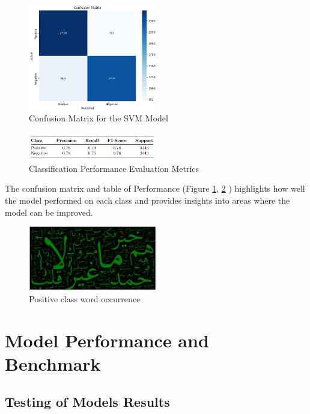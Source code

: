 \documentclass[a4paper,40pt,twocolumn]{article}
\begin{document}
\begin{figure}[H]
    \centering
    \includegraphics[width=0.5\textwidth]{svm_eval.png}
    \caption{Confusion Matrix for the SVM Model}
    \label{fig:confusion_matrix}
\end{figure}
\begin{figure}[H]
    \centering
    \includegraphics[width=0.5\textwidth]{metrics.png}
    \caption{Classification Performance Evaluation Metrics}
    \label{fig:ClassificationMetrics}
\end{figure}

The confusion matrix and table of Performance (Figure \ref{fig:confusion_matrix}, \ref{fig:ClassificationMetrics} ) highlights how well the model performed on each class and provides insights into areas where the model can be improved.


\begin{figure}[H]
    \centering
    \includegraphics[width=0.5\textwidth]{cloud_pos.png}
    \caption{Positive class word occurrence}
    \label{fig:positive words}
\end{figure}
\section{Model Performance and Benchmark}
\subsection{Testing of Models Results }
\end{document}
